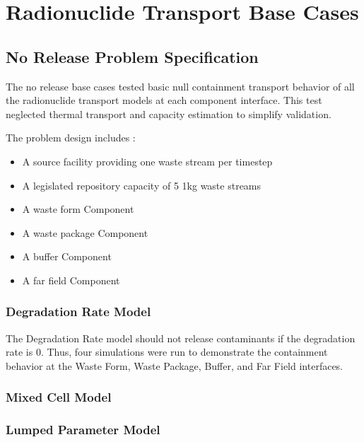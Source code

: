 \section{Radionuclide Transport Base Cases}\label{sec:nuclide_base_cases}
\subsection{No Release Problem Specification}
The no release base cases tested basic null containment transport behavior of 
all the radionuclide transport models at each component interface. This test 
neglected thermal transport and capacity estimation to simplify validation. 

The problem design includes : 
\begin{itemize}
\item{A source facility providing one waste stream per timestep}
\item{A legislated repository capacity of 5 1kg waste streams}
\item{A waste form Component} 
\item{A waste package Component}
\item{A buffer Component}
\item{A far field Component}
\end{itemize}

\subsubsection{Degradation Rate Model}
The Degradation Rate model should not release contaminants if the degradation 
rate is 0. Thus, four simulations were run to demonstrate the containment 
behavior at the Waste Form, Waste Package, Buffer, and Far Field interfaces. 




\subsubsection{Mixed Cell Model}




\subsubsection{Lumped Parameter Model}


